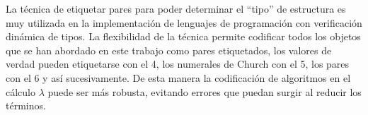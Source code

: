 La técnica de etiquetar pares para poder determinar el ``tipo'' de estructura es muy utilizada en la implementación de lenguajes de programación con verificación dinámica de tipos. La flexibilidad de la técnica permite codificar todos los objetos que se han abordado en este trabajo como pares etiquetados, los valores de verdad pueden etiquetarse con el 4, los numerales de Church con el 5, los pares con el 6 y así sucesivamente. De esta manera la codificación de algoritmos en el cálculo $ λ $  puede ser más robusta, evitando errores que puedan surgir al reducir los términos.


